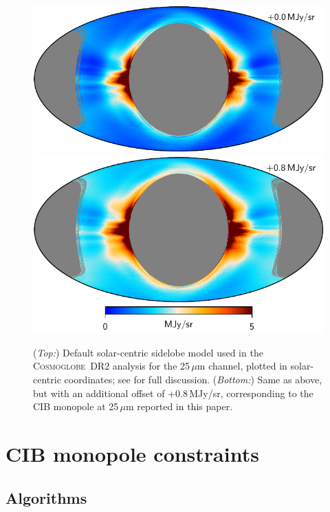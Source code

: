\documentclass{aa}
\newcommand{\cosmoglobe}{\textsc{Cosmoglobe}}
\begin{document}
\begin{figure}
  \centering
  \includegraphics[width=\linewidth]{figs/solarmap_06_v1_mono0.pdf}\\
  \includegraphics[width=\linewidth]{figs/solarmap_06_v1_mono8.pdf}
  \caption{(\emph{Top:}) Default solar-centric sidelobe model used in the \cosmoglobe\ DR2 analysis for the 25\,$\mu$m channel, plotted in solar-centric coordinates; see \citet{CG02_01} for full discussion. (\emph{Bottom:}) Same as above, but with an additional offset of +0.8\,MJy/sr, corresponding to the CIB monopole at 25\,$\mu$m reported in this paper.}
  \label{fig:sidelobe}
\end{figure}


\clearpage
\section{CIB monopole constraints}
\label{sec:mono}

\subsection{Algorithms}
\end{document}
